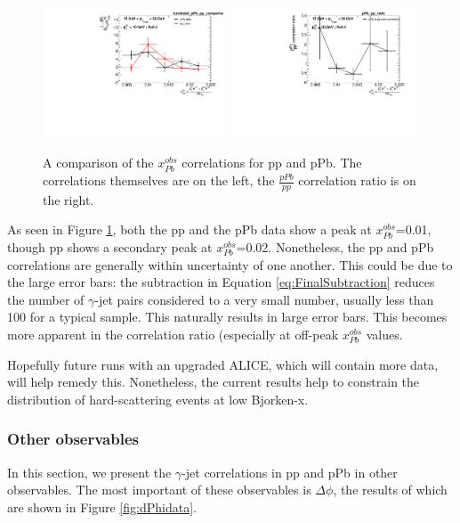 \begin{figure}
    \centering
    \includegraphics[width=0.49\textwidth]{GammaJet/pp_pPb_correlations/hadj_XobsPbLambda0_pPb_pp_comparison_Comparison.pdf}
    \includegraphics[width=0.49\textwidth]{GammaJet/pp_pPb_correlations/hadj_XobsPb_ratiopPb_pp_ratio_Comparison.pdf}
    \caption{A comparison of the $x^{obs}_{Pb}$ correlations for pp and pPb. The correlations themselves are on the left, the $\frac{pPb}{pp}$ correlation ratio is on the right.}
    \label{fig:xobsPbdata}
\end{figure}

As seen in Figure \ref{fig:xobsPbdata}, both the pp and the pPb data show a peak at $x^{obs}_{Pb}$=0.01, though pp shows a secondary peak at $x^{obs}_{Pb}$=0.02. Nonetheless, the pp and pPb correlations are generally within uncertainty of one another. This could be due to the large error bars: the subtraction in Equation \ref{eq:FinalSubtraction} reduces the number of $\gamma$-jet pairs considered to a very small number, usually less than 100 for a typical sample. This naturally results in large error bars. This becomes more apparent in the correlation ratio (especially at off-peak $x^{obs}_{Pb}$ values.

Hopefully future runs with an upgraded ALICE, which will contain more data, will help remedy this. Nonetheless, the current results help to constrain the distribution of hard-scattering events at low Bjorken-x. 

\subsubsection{Other observables}
In this section, we present the $\gamma$-jet correlations in pp and pPb in other observables. The most important of these observables is $\Delta \phi$, the results of which are shown in Figure \ref{fig:dPhidata}.

